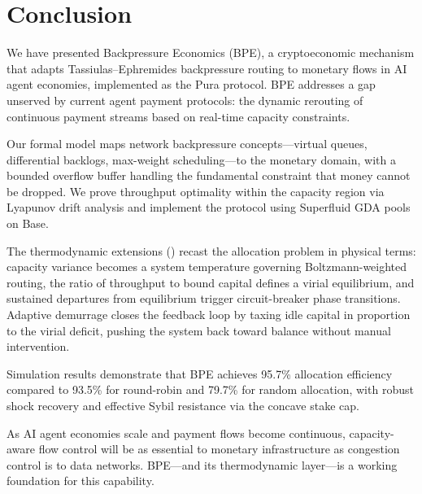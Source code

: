 \section{Conclusion}
\label{sec:conclusion}

We have presented Backpressure Economics (BPE), a cryptoeconomic mechanism that
adapts Tassiulas--Ephremides backpressure routing to monetary flows in AI agent
economies, implemented as the Pura protocol. BPE addresses a gap unserved by
current agent payment protocols: the dynamic rerouting of continuous payment
streams based on real-time capacity constraints.

Our formal model maps network backpressure concepts---virtual queues, differential
backlogs, max-weight scheduling---to the monetary domain, with a bounded overflow
buffer handling the fundamental constraint that money cannot be dropped. We prove
throughput optimality within the capacity region via Lyapunov drift analysis and
implement the protocol using Superfluid GDA pools on Base.

The thermodynamic extensions () recast the allocation
problem in physical terms: capacity variance becomes a system temperature
governing Boltzmann-weighted routing, the ratio of throughput to bound capital
defines a virial equilibrium, and sustained departures from equilibrium trigger
circuit-breaker phase transitions. Adaptive demurrage closes the feedback loop by
taxing idle capital in proportion to the virial deficit, pushing the system back
toward balance without manual intervention.

Simulation results demonstrate that BPE achieves 95.7\% allocation efficiency
compared to 93.5\% for round-robin and 79.7\% for random allocation, with robust
shock recovery and effective Sybil resistance via the concave stake cap.

As AI agent economies scale and payment flows become continuous, capacity-aware
flow control will be as essential to monetary infrastructure as congestion control
is to data networks. BPE---and its thermodynamic layer---is a working foundation
for this capability.
